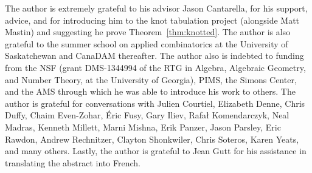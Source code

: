 \documentclass[submission%
]{dmtcs}
\begin{document}
The author is extremely grateful to his advisor Jason Cantarella, for
his support, advice, and for introducing him to the knot tabulation project
(alongside Matt Mastin) and suggesting he prove
Theorem~\ref{thm:knotted}. The author is also grateful to the summer
school on applied combinatorics at the University of Saskatchewan and
CanaDAM thereafter. The author also is indebted to funding from the NSF
(grant DMS-1344994 of the RTG in Algebra, Algebraic Geometry, and
Number Theory, at the University of Georgia), PIMS, the Simons Center,
and the AMS through which he was able to introduce his work to
others. The author is grateful for conversations with Julien Courtiel,
Elizabeth Denne, Chris Duffy, Chaim Even-Zohar, \'Eric Fusy, Gary
Iliev, Rafa\l{} Komendarczyk, Neal Madras, Kenneth Millett, Marni
Mishna, Erik Panzer, Jason Parsley, Eric Rawdon, Andrew Rechnitzer,
Clayton Shonkwiler, Chris Soteros, Karen Yeats, and many
others. Lastly, the author is grateful to Jean Gutt for his assistance
in translating the abstract into French.


%

\label{sec:biblio}
\end{document}
